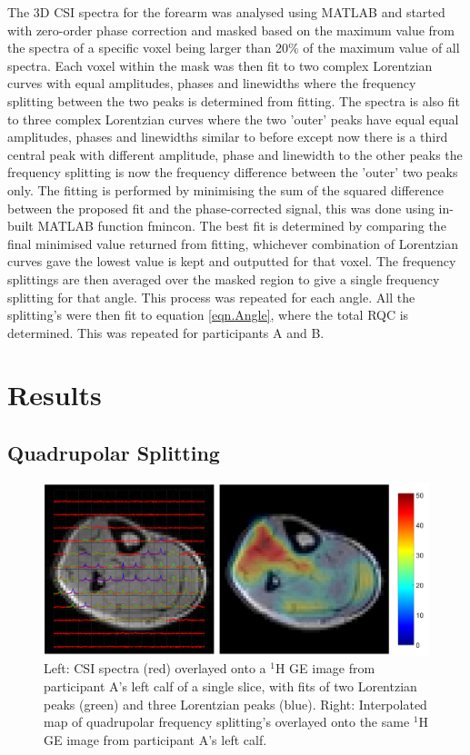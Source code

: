 \documentclass[class=article, crop=false]{standalone}
\begin{document}
The 3D CSI spectra for the forearm was analysed using MATLAB and started with zero-order phase correction and masked based on the maximum value from the spectra of a specific voxel being larger than 20\% of the maximum value of all spectra. Each voxel within the mask was then fit to two complex Lorentzian curves with equal amplitudes, phases and linewidths where the frequency splitting between the two peaks is determined from fitting. The spectra is also fit to three complex Lorentzian curves where the two 'outer' peaks have equal equal amplitudes, phases and linewidths similar to before except now there is a third central peak with different amplitude, phase and linewidth to the other peaks the frequency splitting is now the frequency difference between the 'outer' two peaks only. The fitting is performed by minimising the sum of the squared difference between the proposed fit and the phase-corrected signal, this was done using in-built MATLAB function fmincon. The best fit is determined by comparing the final minimised value returned from fitting, whichever combination of Lorentzian curves gave the lowest value is kept and outputted for that voxel. The frequency splittings are then averaged over the masked region to give a single frequency splitting for that angle. This process was repeated for each angle. All the splitting's were then fit to equation \ref{eqn.Angle}, where the total RQC is determined. This was repeated for participants A and B.

\section{Results}

\subsection{Quadrupolar Splitting}

\begin{figure}
    \centering
    \includegraphics[width=1\textwidth]{Figures/D2O/Calf_A.png}
    \caption{Left: CSI spectra (red) overlayed onto a $^1$H GE image from participant A's left calf of a single slice, with fits of two Lorentzian peaks (green) and three Lorentzian peaks (blue). Right: Interpolated map of quadrupolar frequency splitting's overlayed onto the same $^1$H GE image from participant A's left calf. }
    \label{fig:D2O:Calf_A}
\end{figure}
\end{document}
